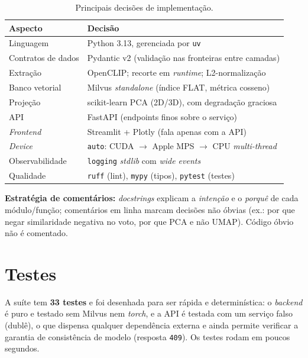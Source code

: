 \documentclass[10pt]{article}
\begin{document}
\begin{table}[H]
\centering
\begin{tabular}{@{}p{4cm}p{10cm}@{}}
\toprule
\textbf{Aspecto} & \textbf{Decisão} \\
\midrule
Linguagem & Python 3.13, gerenciada por \texttt{uv} \\
Contratos de dados & Pydantic v2 (validação nas fronteiras entre camadas) \\
Extração & OpenCLIP; recorte em \emph{runtime}; L2-normalização \\
Banco vetorial & Milvus \emph{standalone} (índice FLAT, métrica cosseno) \\
Projeção & scikit-learn PCA (2D/3D), com degradação graciosa \\
API & FastAPI (endpoints finos sobre o serviço) \\
\emph{Frontend} & Streamlit + Plotly (fala apenas com a API) \\
\emph{Device} & \texttt{auto}: CUDA $\rightarrow$ Apple MPS $\rightarrow$ CPU \emph{multi-thread} \\
Observabilidade & \texttt{logging} \emph{stdlib} com \emph{wide events} \\
Qualidade & \texttt{ruff} (lint), \texttt{mypy} (tipos), \texttt{pytest} (testes) \\
\bottomrule
\end{tabular}
\caption{Principais decisões de implementação.}
\end{table}

\noindent\textbf{Estratégia de comentários:} \emph{docstrings} explicam a
\emph{intenção} e o \emph{porquê} de cada módulo/função; comentários em linha
marcam decisões não óbvias (ex.: por que negar similaridade negativa no voto,
por que PCA e não UMAP). Código óbvio não é comentado.

\section{Testes}

A suíte tem \textbf{33 testes} e foi desenhada para ser rápida e determinística:
o \emph{backend} é puro e testado sem Milvus nem \emph{torch}, e a API é testada
com um serviço falso (dublê), o que dispensa qualquer dependência externa e
ainda permite verificar a garantia de consistência de modelo (resposta
\texttt{409}). Os testes rodam em poucos segundos.
\end{document}
